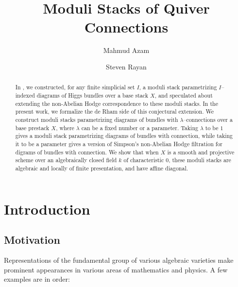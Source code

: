 \documentclass[11pt]{amsart}
\title[Moduli Stacks of Quiver Connections]
      {Moduli Stacks of Quiver Connections}
\author{Mahmud Azam}
\author{Steven Rayan}
\begin{document}
\maketitle

\begin{abstract}
In \cite{ModQuivBun}, we constructed, for any finite simplicial set $I$, a
moduli stack parametrizing  $I$--indexed diagrams of Higgs bundles over a base
stack $X$, and speculated about extending the non-Abelian Hodge correspondence
to these moduli stacks. In the present work, we formalize the de Rham side of
this conjectural extension. We construct moduli stacks parametrizing diagrams of
bundles with $\lambda$--connections over a base prestack $X$, where $\lambda$
can be a fixed number or a parameter. Taking $\lambda$ to be $1$ gives a moduli
stack parametrizing diagrams of bundles with connection, while taking it to be a
parameter gives a version of Simpson's non-Abelian Hodge filtration for digrams
of bundles with connection. We show that when $X$ is a smooth and projective
scheme over an algebraically closed field $k$ of characteristic $0$, these
moduli stacks are algebraic and locally of finite presentation, and have affine
diagonal.
\end{abstract}

\tableofcontents


\section{Introduction}

\subsection{Motivation}

Representations of the fundamental group of various algebraic varieties make
prominent appearances in various areas of mathematics and physics. A few
examples are in order:
\end{document}
